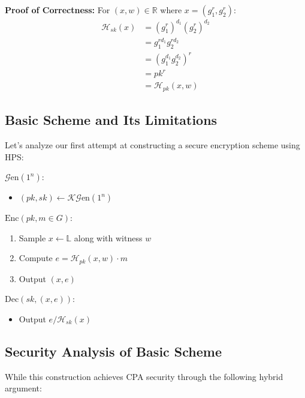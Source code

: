 \textbf{Proof of Correctness:}
For $(x,w) \in \mathbb{R}$ where $x=(g_1^r, g_2^r)$:
\begin{align*}
    \mathcal{H}_{sk}(x) &= (g_1^r)^{d_1}(g_2^r)^{d_2} \\
    &= g_1^{rd_1}g_2^{rd_2} \\
    &= (g_1^{d_1}g_2^{d_2})^r \\
    &= pk^r \\
    &= \mathcal{H}_{pk}(x,w)
\end{align*}

\subsection{Basic Scheme and Its Limitations}

Let's analyze our first attempt at constructing a secure encryption scheme using HPS:

$\mathcal{G}\text{en}(1^n)$:
\begin{itemize}
    \item $(pk,sk) \leftarrow \mathcal{K}\mathcal{G}\text{en}(1^n)$
\end{itemize}

$\text{Enc}(pk,m \in G)$:
\begin{enumerate}
    \item Sample $x \leftarrow \mathbb{L}$ along with witness $w$
    \item Compute $e = \mathcal{H}_{pk}(x,w) \cdot m$
    \item Output $(x,e)$
\end{enumerate}

$\text{Dec}(sk,(x,e))$:
\begin{itemize}
    \item Output $e/\mathcal{H}_{sk}(x)$
\end{itemize}

\subsection{Security Analysis of Basic Scheme}

While this construction achieves CPA security through the following hybrid argument:


